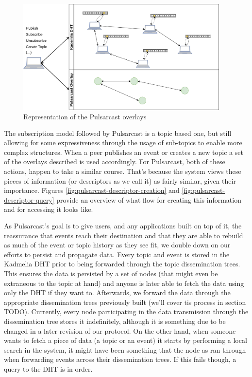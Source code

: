\begin{figure}[hb!]
  \centering
  \includegraphics[width=0.95\textwidth]{img/pulsarcast-overlays.png}
  \caption{Representation of the Pulsarcast overlays}
  \label{fig:pulsarcast-overlays}
\end{figure}

The subscription model followed by Pulsarcast is a topic based one, but still
allowing for some expressiveness through the usage of sub-topics to enable more
complex structures. When a peer publishes an event or creates a new topic a set
of the overlays described is used accordingly. For Pulsarcast, both of these
actions, happen to take a similar course. That's because the system views these
pieces of information (or descriptors as we call it) as fairly similar, given
their importance. Figures \ref{fig:pulsarcast-descriptor-creation} and
\ref{fig:pulsarcast-descriptor-query} provide an overview of what flow for
creating this information and for accessing it looks like.

As Pulsarcast's goal is to give users, and any applications built on top of it,
the reassurance that events reach their destination and that they are able to
rebuild as much of the event or topic history as they see fit, we double down
on our efforts to persist and propagate data. Every topic and event is stored
in the Kadmelia DHT prior to being forwarded through the topic dissemination
trees. This ensures the data is persisted by a set of nodes (that might even be
extraneous to the topic at hand) and anyone is later able to fetch the data
using only the DHT if they want to. Afterwards, we forward the data through the
appropriate dissemination trees previously built (we'll cover tis process in
section TODO). Currently, every node participating in the data transmission through
the dissemination tree stores it indefinitely, although it is something due to
be changed in a later revision of our protocol. On the other hand, when someone
wants to fetch a piece of data (a topic or an event) it starts by performing a
local search in the system, it might have been something that the node as ran
through when forwarding events across their dissemination trees. If this fails
though, a query to the DHT is in order.

